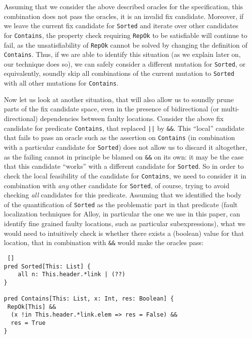 \noindent
Assuming that we consider the above described oracles for the specification, this combination does not pass the oracles, it is an invalid fix candidate. Moreover, if we leave the current fix candidate for \texttt{Sorted} and iterate over other candidates for \texttt{Contains}, the property check requiring \texttt{RepOk} to be satisfiable will continue to fail, as the unsatisfiability of \texttt{RepOk} cannot be solved by changing the definition of \texttt{Contains}. Thus, if we are able to identify this situation (as we explain later on, our technique does so), we can safely consider a different mutation for \texttt{Sorted}, or equivalently, soundly skip all combinations of the current mutation to \texttt{Sorted} with all other mutations for \texttt{Contains}. 

Now let us look at another situation, that will also allow us to soundly prune parts of the fix candidate space, even in the presence of bidirectional (or multi-directional) dependencies between faulty locations. Consider the above fix candidate for predicate \texttt{Contains}, that replaced \texttt{||} by \texttt{\&\&}. This ``local'' candidate that fails to pass an oracle such as the assertion on \texttt{Contains} (in combination with a particular candidate for \texttt{Sorted}) does not allow us to discard it altogether, as the failing cannot in principle be blamed on \texttt{\&\&} on its own: it may be the case that this candidate ``works'' with a different candidate for \texttt{Sorted}. So in order to check the local feasibility of the candidate for \texttt{Contains}, we need to consider it in combination with \emph{any} other candidate for \texttt{Sorted}, of course, trying to avoid checking \emph{all} candidates for this predicate. Assuming that we identified the body of the quantification of \texttt{Sorted} as the problematic part in that predicate (fault localization techniques for Alloy, in particular the one we use in this paper, can identify fine grained faulty locations, such as particular subexpressions), what we would need to intuitively check is whether there exists a (boolean) value for that location, that in combination with \texttt{\&\&} would make the oracles pass:

\begin{lstlisting} []
pred Sorted[This: List] {
    all n: This.header.*link | (??)
}

pred Contains[This: List, x: Int, res: Boolean] {
 RepOk[This] && 
  (x !in This.header.*link.elem => res = False) && 
  res = True
}

\end{lstlisting}

